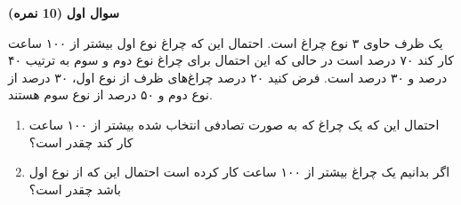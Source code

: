\Large \textbf{سوال اول}
\Large \textbf{(10 نمره)}

\normalsize \vspace{0.5cm}

یک ظرف حاوی ۳ نوع چراغ است. احتمال این که چراغ نوع اول بیشتر از ۱۰۰ ساعت کار کند ۷۰ درصد است در حالی که این احتمال برای چراغ نوع دوم و سوم به ترتیب ۴۰ درصد و ۳۰ درصد است. فرض کنید ۲۰ درصد چراغ‌های ظرف از نوع اول، ۳۰ درصد از نوع دوم و ۵۰ درصد از نوع سوم هستند. 

\begin{enumerate}[label=(\alph*)]
	\item احتمال این که یک چراغ که به صورت تصادفی انتخاب شده بیشتر از ۱۰۰ ساعت کار کند چقدر است؟
	\item اگر بدانیم یک چراغ بیشتر از ۱۰۰ ساعت کار کرده است احتمال این که از نوع اول باشد چقدر است؟
\end{enumerate}